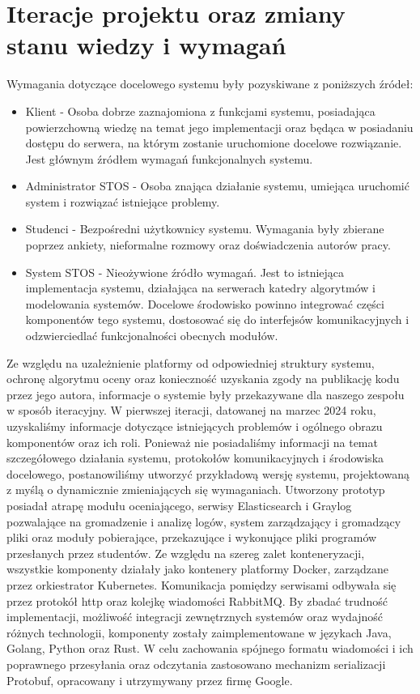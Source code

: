 \section{Iteracje projektu oraz zmiany stanu wiedzy i wymagań}
Wymagania dotyczące docelowego systemu były pozyskiwane z poniższych źródeł:
\begin{itemize}
    \item Klient - Osoba dobrze zaznajomiona z funkcjami systemu, posiadająca powierzchowną wiedzę na temat jego implementacji oraz będąca w posiadaniu dostępu do serwera, na którym zostanie uruchomione docelowe rozwiązanie. Jest głównym źródłem wymagań funkcjonalnych systemu.
    \item Administrator STOS - Osoba znająca działanie systemu, umiejąca uruchomić system i rozwiązać istniejące problemy.
    \item Studenci - Bezpośredni użytkownicy systemu. Wymagania były zbierane poprzez ankiety, nieformalne rozmowy oraz doświadczenia autorów pracy.
    \item System STOS - Nieożywione źródło wymagań. Jest to istniejąca implementacja systemu, działająca na serwerach katedry algorytmów i modelowania systemów. Docelowe środowisko powinno  integrować części komponentów tego systemu, dostosować się do interfejsów komunikacyjnych i odzwierciedlać funkcjonalności obecnych modułów.
\end{itemize}
\indent Ze względu na uzależnienie platformy od odpowiedniej struktury systemu, ochronę algorytmu oceny oraz konieczność uzyskania zgody na publikację kodu przez jego autora, informacje o systemie były przekazywane dla naszego zespołu w sposób iteracyjny.
\newline \indent W pierwszej iteracji, datowanej na marzec 2024 roku, uzyskaliśmy informacje dotyczące istniejących problemów i ogólnego obrazu komponentów oraz ich roli. Ponieważ nie posiadaliśmy informacji na temat szczegółowego działania systemu, protokołów komunikacyjnych i środowiska docelowego, postanowiliśmy utworzyć przykładową wersję systemu, projektowaną z myślą o dynamicznie zmieniających się wymaganiach. Utworzony prototyp posiadał atrapę modułu oceniającego, serwisy Elasticsearch i Graylog pozwalające na gromadzenie i analizę logów, system zarządzający i gromadzący pliki oraz moduły pobierające, przekazujące i wykonujące pliki programów przesłanych przez studentów. Ze względu na szereg zalet konteneryzacji, wszystkie komponenty działały jako kontenery platformy Docker, zarządzane przez orkiestrator Kubernetes. Komunikacja pomiędzy serwisami odbywała się przez protokół http oraz kolejkę wiadomości RabbitMQ. By zbadać trudność implementacji, możliwość integracji zewnętrznych systemów oraz wydajność różnych technologii, komponenty zostały zaimplementowane w językach Java, Golang, Python oraz Rust. W celu zachowania spójnego formatu wiadomości i ich poprawnego przesyłania oraz odczytania zastosowano mechanizm serializacji Protobuf, opracowany i utrzymywany przez firmę Google.
